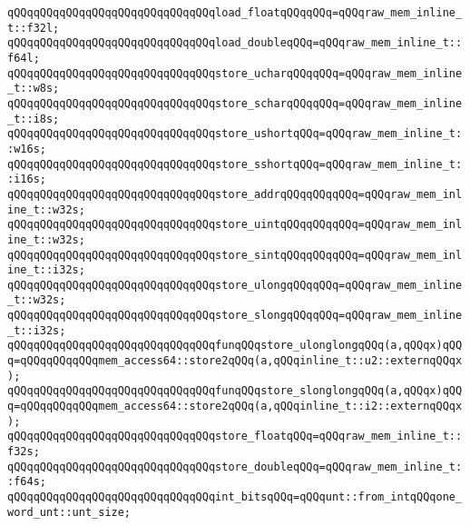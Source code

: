 \newline
\verb|qQQqqQQqqQQqqQQqqQQqqQQqqQQqqQQqload_floatqQQqqQQq=qQQqraw_mem_inline_t::f32l;|\newline
\verb|qQQqqQQqqQQqqQQqqQQqqQQqqQQqqQQqload_doubleqQQq=qQQqraw_mem_inline_t::f64l;|\newline
\newline
\verb|qQQqqQQqqQQqqQQqqQQqqQQqqQQqqQQqstore_ucharqQQqqQQq=qQQqraw_mem_inline_t::w8s;|\newline
\verb|qQQqqQQqqQQqqQQqqQQqqQQqqQQqqQQqstore_scharqQQqqQQq=qQQqraw_mem_inline_t::i8s;|\newline
\newline
\verb|qQQqqQQqqQQqqQQqqQQqqQQqqQQqqQQqstore_ushortqQQq=qQQqraw_mem_inline_t::w16s;|\newline
\verb|qQQqqQQqqQQqqQQqqQQqqQQqqQQqqQQqstore_sshortqQQq=qQQqraw_mem_inline_t::i16s;|\newline
\newline
\verb|qQQqqQQqqQQqqQQqqQQqqQQqqQQqqQQqstore_addrqQQqqQQqqQQq=qQQqraw_mem_inline_t::w32s;|\newline
\verb|qQQqqQQqqQQqqQQqqQQqqQQqqQQqqQQqstore_uintqQQqqQQqqQQq=qQQqraw_mem_inline_t::w32s;|\newline
\verb|qQQqqQQqqQQqqQQqqQQqqQQqqQQqqQQqstore_sintqQQqqQQqqQQq=qQQqraw_mem_inline_t::i32s;|\newline
\newline
\verb|qQQqqQQqqQQqqQQqqQQqqQQqqQQqqQQqstore_ulongqQQqqQQq=qQQqraw_mem_inline_t::w32s;|\newline
\verb|qQQqqQQqqQQqqQQqqQQqqQQqqQQqqQQqstore_slongqQQqqQQq=qQQqraw_mem_inline_t::i32s;|\newline
\newline
\verb|qQQqqQQqqQQqqQQqqQQqqQQqqQQqqQQqfunqQQqstore_ulonglongqQQq(a,qQQqx)qQQq=qQQqqQQqqQQqmem_access64::store2qQQq(a,qQQqinline_t::u2::externqQQqx);|\newline
\verb|qQQqqQQqqQQqqQQqqQQqqQQqqQQqqQQqfunqQQqstore_slonglongqQQq(a,qQQqx)qQQq=qQQqqQQqqQQqmem_access64::store2qQQq(a,qQQqinline_t::i2::externqQQqx);|\newline
\newline
\verb|qQQqqQQqqQQqqQQqqQQqqQQqqQQqqQQqstore_floatqQQq=qQQqraw_mem_inline_t::f32s;|\newline
\verb|qQQqqQQqqQQqqQQqqQQqqQQqqQQqqQQqstore_doubleqQQq=qQQqraw_mem_inline_t::f64s;|\newline
\newline
\verb|qQQqqQQqqQQqqQQqqQQqqQQqqQQqqQQqint_bitsqQQq=qQQqunt::from_intqQQqone_word_unt::unt_size;|\newline
